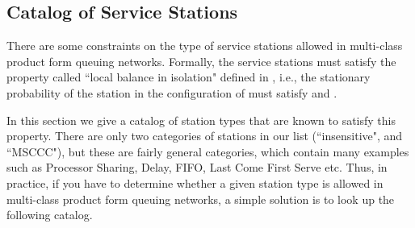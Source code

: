 %

\subsection{Catalog of Service Stations}
\label{sec-q-qnet-cat} There are some constraints
on the type of service stations allowed in
multi-class product form queuing networks.
Formally, the service stations must satisfy the
property called ``local balance in isolation"
defined in , i.e., the stationary
probability of the station in the configuration of 
must satisfy  and .

In this section we give a catalog of
station types that are known to satisfy this
property. There are only two categories of
stations in our list (``insensitive", and
``MSCCC"), but these are fairly general
categories, which contain many examples such as
Processor Sharing, Delay, FIFO, Last Come First
Serve etc. Thus, in practice, if you have to
determine whether a given station type is allowed
in multi-class product form queuing networks, a
simple solution is to look up the following
catalog.

